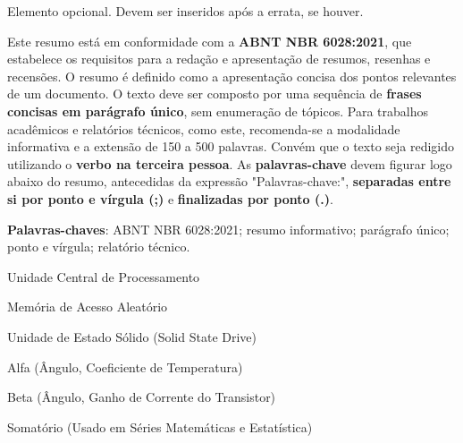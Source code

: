 \documentclass{Arquivos/TrabalhoAcademico}
\begin{document}
\nocite{*}


\pretextual %


\folhaderosto
\contracapa


Elemento opcional. Devem ser inseridos após a errata, se houver.




\begin{resumo}
Este resumo está em conformidade com a \textbf{ABNT NBR 6028:2021}, que estabelece os requisitos para a redação e apresentação de resumos, resenhas e recensões. O resumo é definido como a apresentação concisa dos pontos relevantes de um documento. O texto deve ser composto por uma sequência de \textbf{frases concisas em parágrafo único}, sem enumeração de tópicos. Para trabalhos acadêmicos e relatórios técnicos, como este, recomenda-se a modalidade informativa e a extensão de 150 a 500 palavras. Convém que o texto seja redigido utilizando o \textbf{verbo na terceira pessoa}. As \textbf{palavras-chave} devem figurar logo abaixo do resumo, antecedidas da expressão "Palavras-chave:", \textbf{separadas entre si por ponto e vírgula (;)} e \textbf{finalizadas por ponto (.)}.

\textbf{Palavras-chaves}: ABNT NBR 6028:2021; resumo informativo; parágrafo único; ponto e vírgula; relatório técnico.
\end{resumo}


\begin{resumoEN}

\end{resumoEN}


\listaDeFiguras
\listaDeTabelas


\begin{siglas}
    \item[CPU] Unidade Central de Processamento
    \item[RAM] Memória de Acesso Aleatório
    \item[SSD] Unidade de Estado Sólido (Solid State Drive)
\end{siglas}


\begin{simbolos}
    \item[$\alpha$] Alfa (Ângulo, Coeficiente de Temperatura)
    \item[$\beta$] Beta (Ângulo, Ganho de Corrente do Transistor)
    \item[$\sum$] Somatório (Usado em Séries Matemáticas e Estatística)
\end{simbolos}
\end{document}
